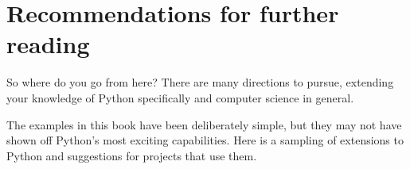

%

\chapter{Recommendations for further reading}

So where do you go from here?  There are many directions to pursue,
extending your knowledge of Python specifically and
computer science in general.

The examples in this book have been deliberately simple, but they
may not have shown off Python's most exciting capabilities.
Here is a sampling of extensions to Python and suggestions for
projects that use them.

